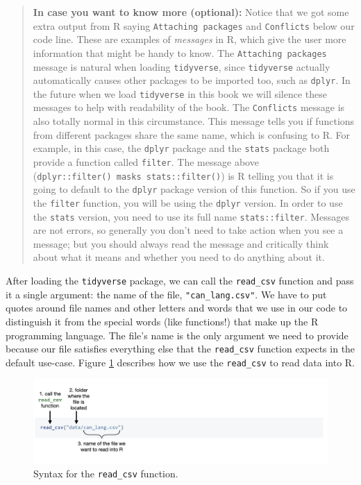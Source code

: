 \documentclass[
]{book}
\begin{document}
\begin{quote}
\textbf{In case you want to know more (optional):} Notice that we got some extra
output from R saying \texttt{Attaching\ packages} and \texttt{Conflicts} below our code
line. These are examples of \emph{messages} in R, which give the user more
information that might be handy to know. The \texttt{Attaching\ packages} message is
natural when loading \texttt{tidyverse}, since \texttt{tidyverse} actually automatically
causes other packages to be imported too, such as \texttt{dplyr}. In the future
when we load \texttt{tidyverse} in this book we will silence these messages to help
with readability of the book. The \texttt{Conflicts} message is also totally normal
in this circumstance. This message tells you if functions from different
packages share the same name, which is confusing to R. For example, in this
case, the \texttt{dplyr} package and the \texttt{stats} package both provide a function
called \texttt{filter}. The message above (\texttt{dplyr::filter()\ masks\ stats::filter()})
is R telling you that it is going to default to the \texttt{dplyr} package version
of this function. So if you use the \texttt{filter} function, you will be using the
\texttt{dplyr} version. In order to use the \texttt{stats} version, you need to use its
full name \texttt{stats::filter}. Messages are not errors, so generally you don't
need to take action when you see a message; but you should always read the message
and critically think about what it means and whether you need to do anything
about it.
\end{quote}

After loading the \texttt{tidyverse} package, we can call the \texttt{read\_csv} function and
pass it a single argument: the name of the file, \texttt{"can\_lang.csv"}. We have to
put quotes around file names and other letters and words that we use in our
code to distinguish it from the special words (like functions!) that make up the R programming
language. The file's name is the only argument we need to provide because our
file satisfies everything else that the \texttt{read\_csv} function expects in the default
use-case. Figure \ref{fig:img-read-csv} describes how we use the \texttt{read\_csv}
to read data into R.

\begin{figure}
\centering
\includegraphics{img/read_csv_function.jpeg}
\caption{\label{fig:img-read-csv}Syntax for the \texttt{read\_csv} function.}
\end{figure}
\end{document}
